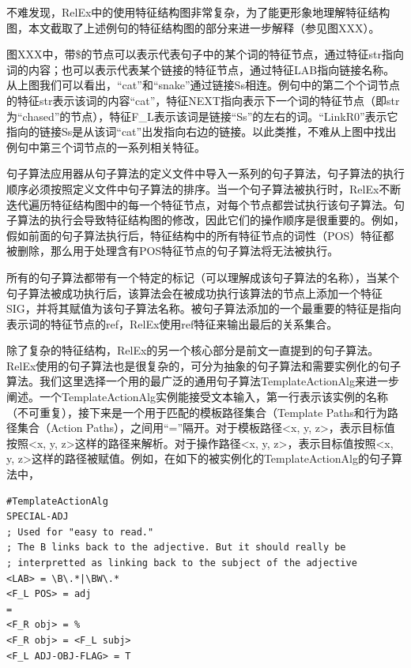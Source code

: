 不难发现，RelEx中的使用特征结构图非常复杂，为了能更形象地理解特征结构图，本文截取了上述例句的特征结构图的部分来进一步解释（参见图XXX）。
 
  图XXX中，带\$的节点可以表示代表句子中的某个词的特征节点，通过特征str指向词的内容；也可以表示代表某个链接的特征节点，通过特征LAB指向链接名称。从上图我们可以看出，“cat”和“snake”通过链接Ss相连。例句中的第二个个词节点的特征str表示该词的内容“cat”，特征NEXT指向表示下一个词的特征节点（即str为“chased”的节点），特征F\_L表示该词是链接“Ss”的左右的词。“LinkR0”表示它指向的链接Ss是从该词“cat”出发指向右边的链接。以此类推，不难从上图中找出例句中第三个词节点的一系列相关特征。


句子算法应用器从句子算法的定义文件中导入一系列的句子算法，句子算法的执行顺序必须按照定义文件中句子算法的排序。当一个句子算法被执行时，RelEx不断迭代遍历特征结构图中的每一个特征节点，对每个节点都尝试执行该句子算法。句子算法的执行会导致特征结构图的修改，因此它们的操作顺序是很重要的。例如，假如前面的句子算法执行后，特征结构中的所有特征节点的词性（POS）特征都被删除，那么用于处理含有POS特征节点的句子算法将无法被执行。

所有的句子算法都带有一个特定的标记（可以理解成该句子算法的名称），当某个句子算法被成功执行后，该算法会在被成功执行该算法的节点上添加一个特征SIG，并将其赋值为该句子算法名称。被句子算法添加的一个最重要的特征是指向表示词的特征节点的ref，RelEx使用ref特征来输出最后的关系集合。

除了复杂的特征结构，RelEx的另一个核心部分是前文一直提到的句子算法。RelEx使用的句子算法也是很复杂的，可分为抽象的句子算法和需要实例化的句子算法。我们这里选择一个用的最广泛的通用句子算法TemplateActionAlg来进一步阐述。一个TemplateActionAlg实例能接受文本输入，第一行表示该实例的名称（不可重复），接下来是一个用于匹配的模板路径集合（Template Paths和行为路径集合（Action Paths），之间用“=”隔开。对于模板路径\textless x, y, z\textgreater ，表示目标值按照\textless x, y, z\textgreater 这样的路径来解析。对于操作路径\textless x, y, z\textgreater ，表示目标值按照\textless x, y, z\textgreater 这样的路径被赋值。例如，在如下的被实例化的TemplateActionAlg的句子算法中，

\begin{verbatim}
#TemplateActionAlg
SPECIAL-ADJ
; Used for "easy to read." 
; The B links back to the adjective. But it should really be
; interpretted as linking back to the subject of the adjective
<LAB> = \B\.*|\BW\.*
<F_L POS> = adj
=
<F_R obj> = %
<F_R obj> = <F_L subj>
<F_L ADJ-OBJ-FLAG> = T
\end{verbatim}

